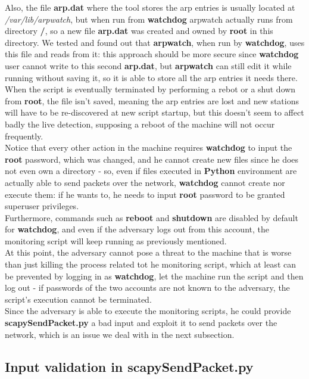 Also, the file \textbf{arp.dat} where the tool stores the arp entries is usually located at \textit{/var/lib/arpwatch}, but when run from \textbf{watchdog} arpwatch actually runs from directory \textbf{/}, so a new file \textbf{arp.dat} was created and owned by \textbf{root} in this directory. We tested and found out that \textbf{arpwatch}, when run by \textbf{watchdog}, uses this file and reads from it: this approach should be more secure since \textbf{watchdog} user cannot write to this second \textbf{arp.dat}, but \textbf{arpwatch} can still edit it while running without saving it, so it is able to store all the arp entries it needs there. When the script is eventually terminated by performing a rebot or a shut down from \textbf{root}, the file isn't saved, meaning the arp entries are lost and new stations will have to be re-discovered at new script startup, but this doesn't seem to affect badly the live detection, supposing a reboot of the machine will not occur frequently.\\
Notice that every other action in the machine requires \textbf{watchdog} to input the \textbf{root} password, which was changed, and he cannot create new files since he does not even own a directory - so, even if files executed in \textbf{Python} environment are actually able to send packets over the network, \textbf{watchdog} cannot create nor execute them: if he wants to, he needs to input \textbf{root} password to be granted superuser privileges.\\
Furthermore, commands such as \textbf{reboot} and \textbf{shutdown} are disabled by default for \textbf{watchdog}, and even if the adversary logs out from this account, the monitoring script will keep running as previously mentioned.\\
At this point, the adversary cannot pose a threat to the machine that is worse than just killing the process related tot he monitoring script, which at least can be prevented by logging in as \textbf{watchdog}, let the machine run the script and then log out - if passwords of the two accounts are not known to the adversary, the script's execution cannot be terminated.\\
Since the adversary is able to execute the monitoring scripts, he could provide \textbf{scapySendPacket.py} a bad input and exploit it to send packets over the network, which is an issue we deal with in the next subsection.\\

\subsection{Input validation in scapySendPacket.py}
